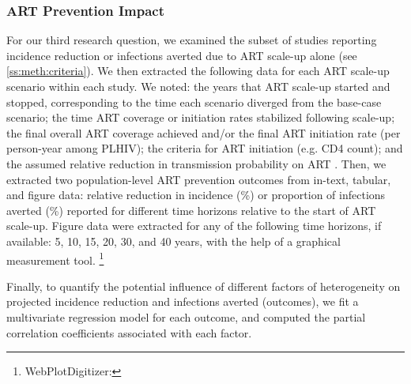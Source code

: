 \subsubsection{ART Prevention Impact}
\label{sss:meth:api}
For our third research question, we examined the subset of studies
reporting incidence reduction or infections averted
due to ART scale-up alone (see \ref{ss:meth:criteria}).
We then extracted the following data for each ART scale-up scenario within each study.
We noted: the years that ART scale-up started and stopped, corresponding to
the time each scenario diverged from the base-case scenario;
the time ART coverage or initiation rates stabilized following scale-up;
the final overall ART coverage achieved and/or
the final ART initiation rate (per person-year among PLHIV);
the criteria for ART initiation (e.g. CD4 count);
and the assumed relative reduction in transmission probability on ART .
Then, we extracted two population-level ART prevention outcomes
from in-text, tabular, and figure data:
relative reduction in incidence (\%) or proportion of infections averted (\%)
reported for different time horizons relative to the start of ART scale-up.
Figure data were extracted for any of the following time horizons, if available:
5, 10, 15, 20, 30, and 40 years,
with the help of a graphical measurement tool.%
\footnote{WebPlotDigitizer: }
\par
Finally, to quantify the potential influence of different factors of heterogeneity
on projected incidence reduction and infections averted (outcomes),
we fit a multivariate regression model for each outcome,
and computed the partial correlation coefficients associated with each factor.
